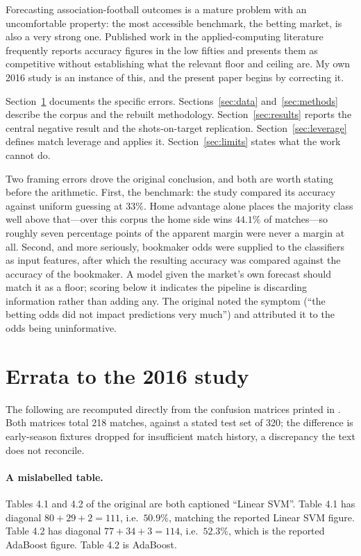 \documentclass[11pt]{article}
\begin{document}
Forecasting association-football outcomes is a mature problem with an
uncomfortable property: the most accessible benchmark, the betting market, is
also a very strong one. Published work in the applied-computing literature
frequently reports accuracy figures in the low fifties and presents them as
competitive without establishing what the relevant floor and ceiling are. My own
2016 study \citep{pitcan2018} is an instance of this, and the present paper
begins by correcting it.

Section~\ref{sec:errata} documents the specific errors. Sections~\ref{sec:data}
and~\ref{sec:methods} describe the corpus and the rebuilt methodology.
Section~\ref{sec:results} reports the central negative result and the
shots-on-target replication. Section~\ref{sec:leverage} defines match leverage
and applies it. Section~\ref{sec:limits} states what the work cannot do.

Two framing errors drove the original conclusion, and both are worth stating
before the arithmetic. First, the benchmark: the study compared its accuracy
against uniform guessing at $33\%$. Home advantage alone places the majority
class well above that---over this corpus the home side wins $44.1\%$ of
matches---so roughly seven percentage points of the apparent margin were never a
margin at all. Second, and more seriously, bookmaker odds were supplied to the
classifiers as input features, after which the resulting accuracy was compared
against the accuracy of the bookmaker. A model given the market's own forecast
should match it as a floor; scoring below it indicates the pipeline is
discarding information rather than adding any. The original noted the symptom
(``the betting odds did not impact predictions very much'') and attributed it to
the odds being uninformative.

\section{Errata to the 2016 study}
\label{sec:errata}

The following are recomputed directly from the confusion matrices printed in
\citet{pitcan2018}. Both matrices total 218 matches, against a stated test set
of 320; the difference is early-season fixtures dropped for insufficient match
history, a discrepancy the text does not reconcile.

\paragraph{A mislabelled table.} Tables 4.1 and 4.2 of the original are both
captioned ``Linear SVM''. Table 4.1 has diagonal $80+29+2 = 111$, i.e.\
$50.9\%$, matching the reported Linear SVM figure. Table 4.2 has diagonal
$77+34+3 = 114$, i.e.\ $52.3\%$, which is the reported AdaBoost figure. Table
4.2 is AdaBoost.
\end{document}
